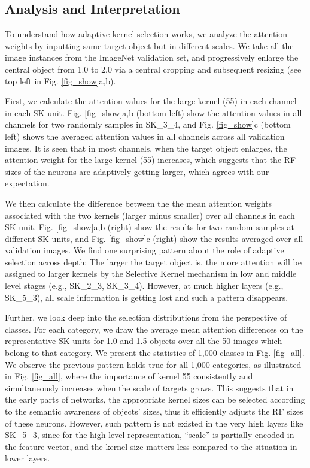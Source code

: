 \documentclass[10pt,twocolumn,letterpaper]{article}
\begin{document}
	\subsection{Analysis and Interpretation}
	To understand how adaptive kernel selection works, we analyze the attention weights by inputting same target object but in different scales. We take all the image instances from the ImageNet validation set, and progressively enlarge the central object from 1.0 to 2.0 via a central cropping and subsequent resizing (see top left in Fig. \ref{fig_show}a,b). 
	
	First, we calculate the attention values for the large kernel (55) in each channel in each SK unit. Fig. \ref{fig_show}a,b (bottom left) show the attention values in all channels for two randomly samples in SK\_3\_4, and Fig. \ref{fig_show}c (bottom left) shows the averaged attention values in all channels across all validation images. It is seen that in most channels, when the target object enlarges, the attention weight for the large kernel (55)  increases, which suggests that the RF sizes of the neurons are adaptively getting larger, which agrees with our expectation. 

	
	We then calculate the difference between the the mean attention weights associated with the two kernels (larger minus smaller) over all channels in each SK unit. Fig. \ref{fig_show}a,b (right) show the results for two random samples at different SK units, and  Fig. \ref{fig_show}c (right) show the results averaged over all validation images. We find one surprising pattern about the role of adaptive selection across depth: The larger the target object is, the more attention will be assigned to larger kernels by the Selective Kernel mechanism in low and middle level stages (e.g., SK\_2\_3, SK\_3\_4). However, at much higher layers (e.g., SK\_5\_3), all scale information is getting lost and such a pattern disappears. 
	
	
	Further, we look deep into the selection distributions from the perspective of classes. For each category, we draw the average mean attention differences on the representative SK units for 1.0 and 1.5 objects over all the 50 images which belong to that category. We present the statistics of 1,000 classes in Fig. \ref{fig_all}. We observe the previous pattern holds true for all 1,000 categories, as illustrated in Fig. \ref{fig_all}, where the importance of kernel 55 consistently and simultaneously increases when the scale of targets grows. This suggests that in the early parts of networks, the appropriate kernel sizes can be selected according to the semantic awareness of objects' sizes, thus it efficiently adjusts the RF sizes of these neurons. However, such pattern is not existed in the very high layers like SK\_5\_3, since for the high-level representation, ``scale'' is partially encoded in the feature vector, and the kernel size matters less compared to the situation in lower layers. 
	
\end{document}
